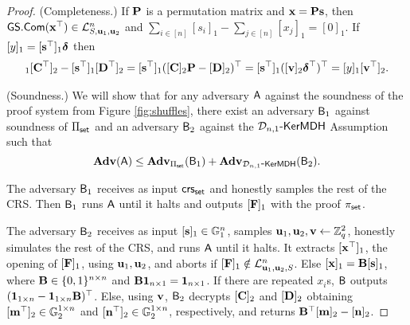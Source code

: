 \begin{proof}
(Completeness.) If $\mathbf{{P}}$ is a permutation matrix and $\mathbf{x}=\mathbf{{P}}\mathbf{s}$, then ${\mathsf{GS}}.\mathsf{Com}(\mathbf{x}^\top)\in\mathcal{L}_{S,\mathbf{u}_1,\mathbf{u}_2}^n$ and $\sum_{i\in[n]}[s_i]_1-\sum_{j\in[n]}[{x}_j]_1=[0]_1$. If $[y]_1=[\mathbf{s}^\top]_1{\boldsymbol \delta}$ then
\begin{eqnarray*}
    [\vecb{x}^\top]_1[\matr{C}^\top]_2-
    [\vecb{s}^\top]_1[\matr{D}^\top]_2
 = 
    [\vecb{s}^\top]_1([\matr{C}]_2\matr{P}-[\matr{D}]_2)^\top
 = 
    [\vecb{s}^\top]_1([\vecb{v}]_2\grkb{\delta}^\top)^\top
 =
    [y]_1[\vecb{v}^\top]_2.
\end{eqnarray*}

(Soundness.)
We will show that for any adversary $\mathsf{A}$ against the soundness of the proof system from Figure \ref{fig:shuffles}, there exist an adversary $\mathsf{B}_1$ against soundness of $\Pi_{\mathsf{set}}$ and an adversary $\mathsf{B}_2$ against the $\mathcal{D}_{n,1}\mbox{-}\mathsf{KerMDH}$ Assumption such that
$$\mathbf{Adv}(\mathsf{A}) \leq \mathbf{Adv}_{\Pi_{\mathsf{set}}}(\mathsf{B}_1) + \mathbf{Adv}_{\mathcal{D}_{n,1}\mbox{-}\mathsf{KerMDH}}(\mathsf{B}_2).
$$

The adversary $\mathsf{B}_1$ receives as input $\mathsf{crs}_{\mathsf{set}}$ and honestly samples the rest of the CRS. Then $\mathsf{B}_1$ runs $\mathsf{A}$ until it halts and outputs $[\mathbf{{F}}]_1$ with the proof $\pi_{\mathsf{set}}$.

The adversary $\mathsf{B}_2$ receives as input $[\mathbf{s}]_1\in\mathbb{G}_1^{n}$, samples $\mathbf{u}_1,\mathbf{u}_2,\mathbf{v}\gets \mathbb{Z}_q^2$, honestly simulates the rest of the CRS, and runs $\mathsf{A}$ until it halts. It extracts $[\mathbf{x}^\top]_1$, the opening of $[\mathbf{{F}}]_1$, using $\mathbf{u}_1,\mathbf{u}_2$, and aborts if $[\mathbf{{F}}]_1\notin\mathcal{L}_{\mathbf{u}_1,\mathbf{u}_2,S}^n$. Else $[\mathbf{x}]_1=\mathbf{{B}}[\mathbf{s}]_1$, where $\mathbf{{B}}\in\{0,1\}^{n\times n}$ and $\mathbf{{B}}\mathbf{{1}}_{n\times 1}=\mathbf{{1}}_{n\times 1}$. If there are repeated $x_i$s, $\mathsf{B}$ outputs $(\mathbf{{1}}_{1\times n}-\mathbf{{1}}_{1\times n}\mathbf{{B}})^\top$. Else, using $\mathbf{v}$, $\mathsf{B}_2$ decrypts $[\mathbf{{C}}]_2$ and $[\mathbf{{D}}]_2$ obtaining $[\mathbf{m}^\top]_2\in\mathbb{G}_2^{1\times n}$ and $[\mathbf{n}^\top]_2\in\mathbb{G}_2^{1\times n}$, respectively, and returns $\mathbf{{B}}^\top[\mathbf{m}]_2-[\mathbf{n}]_2$.


\end{proof}
